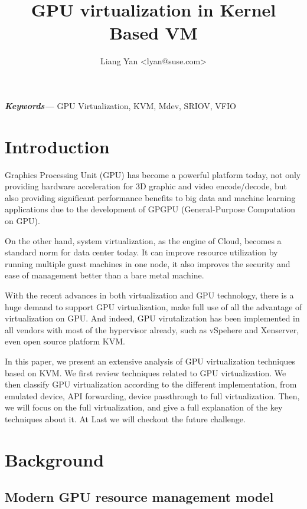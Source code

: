 \documentclass[a4paper,12pt]{article}
\begin{document}
\providecommand{\keywords}[1]
{
  \small	
  \textbf{\textit{Keywords---}} #1
}

\title{GPU virtualization in Kernel Based VM}
\author{Liang Yan \textless lyan@suse.com\textgreater}
\date{}
\maketitle
\keywords{GPU Virtualization, KVM, Mdev, SRIOV, VFIO}

\section{Introduction}
Graphics Processing Unit (GPU) has become a powerful platform today, not only providing hardware acceleration for 3D graphic and video encode/decode, but also providing significant performance benefits to big data and machine learning applications due to the development of GPGPU (General-Purpose Computation on GPU). 

On the other hand, system virtualization, as the engine of Cloud, becomes a standard norm for data center today. It can improve resource utilization by running multiple guest machines in one node, it also improves the security and ease of management better than a bare metal machine\cite{kvm}.

With the recent advances in both virtualization and GPU technology, there is a huge demand to support GPU virtualization, make full use of all the advantage of virtualization on GPU. And indeed, GPU virutalization has been implemented in all vendors with most of the  hypervisor already, such as vSpehere and Xenserver, even open source platform KVM.

In this paper, we present an extensive analysis of GPU virtualization techniques based on KVM. We first review  techniques related to GPU virtualization. We then classify GPU virtualization according to the different implementation, from emulated device, API forwarding, device passthrough to full virtualization. Then, we will focus on the full virtualization, and give a full explanation of the key techniques about it. At Last we will checkout the future challenge. 

\section{Background}

\subsection{Modern GPU resource management model\cite{184002}}
\end{document}
